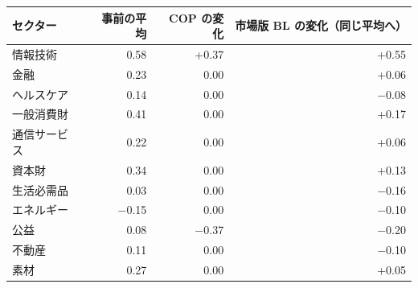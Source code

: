 \begin{tabular}{lrrr}
\toprule
セクター & 事前の平均 & COP の変化 & 市場版 BL の変化（同じ平均へ） \\
\midrule
情報技術 & 0.58 & +0.37 & +0.55 \\
金融 & 0.23 & 0.00 & +0.06 \\
ヘルスケア & 0.14 & 0.00 & \ensuremath{-}0.08 \\
一般消費財 & 0.41 & 0.00 & +0.17 \\
通信サービス & 0.22 & 0.00 & +0.06 \\
資本財 & 0.34 & 0.00 & +0.13 \\
生活必需品 & 0.03 & 0.00 & \ensuremath{-}0.16 \\
エネルギー & \ensuremath{-}0.15 & 0.00 & \ensuremath{-}0.10 \\
公益 & 0.08 & \ensuremath{-}0.37 & \ensuremath{-}0.20 \\
不動産 & 0.11 & 0.00 & \ensuremath{-}0.10 \\
素材 & 0.27 & 0.00 & +0.05 \\
\bottomrule
\end{tabular}
